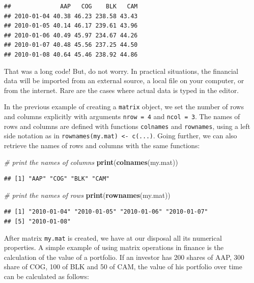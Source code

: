 \documentclass[11pt,]{book}
\newenvironment{Shaded}{\begin{snugshade}}{\end{snugshade}}
\newcommand{\KeywordTok}[1]{\textcolor[rgb]{0.27,0.27,0.27}{\textbf{#1}}}
\newcommand{\CommentTok}[1]{\textcolor[rgb]{0.56,0.35,0.01}{\textit{#1}}}
\newcommand{\NormalTok}[1]{#1}
\begin{document}
\begin{verbatim}
##              AAP   COG    BLK   CAM
## 2010-01-04 40.38 46.23 238.58 43.43
## 2010-01-05 40.14 46.17 239.61 43.96
## 2010-01-06 40.49 45.97 234.67 44.26
## 2010-01-07 40.48 45.56 237.25 44.50
## 2010-01-08 40.64 45.46 238.92 44.86
\end{verbatim}

That was a long code! But, do not worry. In practical situations, the
financial data will be imported from an external source, a local file on
your computer, or from the internet. Rare are the cases where actual
data is typed in the editor.

In the previous example of creating a \texttt{matrix} object, we set the
number of rows and columns explicitly with arguments \texttt{nrow\ =\ 4}
and \texttt{ncol\ =\ 3}. The names of rows and columns are defined with
functions \texttt{colnames} and \texttt{rownames}, using a left side
notation as in \texttt{rownames(my.mat)\ \textless{}-\ c(...)}. Going
further, we can also retrieve the names of rows and columns with the
same functions:  

\begin{Shaded}
\begin{Highlighting}[]
\CommentTok{# print the names of columns }
\KeywordTok{print}\NormalTok{(}\KeywordTok{colnames}\NormalTok{(my.mat))}
\end{Highlighting}
\end{Shaded}

\begin{verbatim}
## [1] "AAP" "COG" "BLK" "CAM"
\end{verbatim}

\begin{Shaded}
\begin{Highlighting}[]
\CommentTok{# print the names of rows}
\KeywordTok{print}\NormalTok{(}\KeywordTok{rownames}\NormalTok{(my.mat))}
\end{Highlighting}
\end{Shaded}

\begin{verbatim}
## [1] "2010-01-04" "2010-01-05" "2010-01-06" "2010-01-07"
## [5] "2010-01-08"
\end{verbatim}

After matrix \texttt{my.mat} is created, we have at our disposal all its
numerical properties. A simple example of using matrix operations in
finance is the calculation of the value of a portfolio. If an investor
has 200 shares of AAP, 300 share of COG, 100 of BLK and 50 of CAM, the
value of his portfolio over time can be calculated as follows:
\end{document}
